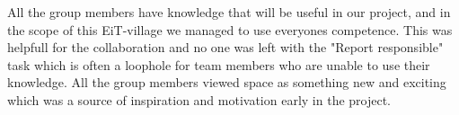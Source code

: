 All the group members have knowledge that will be useful in our project, and in the scope of this EiT-village we managed to use everyones competence. This was helpfull for the collaboration and no one was left with the "Report responsible" task which is often a loophole for team members who are unable to use their knowledge. All the group members viewed space as something new and exciting which was a source of inspiration and motivation early in the project.








